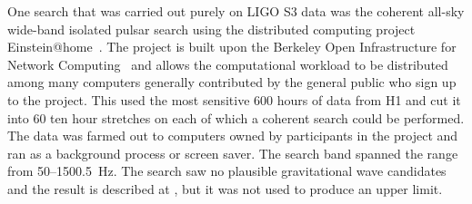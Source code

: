 \documentclass{article}
\begin{document}
One search that was carried out purely on LIGO S3 data was the coherent all-sky
wide-band isolated pulsar search using the distributed computing project
Einstein@home~\cite{eath}. The project is built upon the Berkeley Open
Infrastructure for Network Computing~\cite{BOINC} and allows the computational
workload to be distributed among many computers generally contributed by the
general public who sign up to the project. This used the most sensitive 600
hours of data from H1 and cut it into 60 ten hour stretches on each of which
a coherent search could be performed. The data was farmed out to computers owned
by participants in the project and ran as a background process or screen saver.
The search band spanned the range from 50--1500.5~Hz. The search saw no
plausible gravitational wave candidates and the result is described at
\cite{eathS3}, but it was not used to produce an upper limit.
\end{document}
